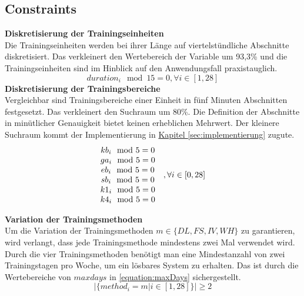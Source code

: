 \subsection{Constraints}
\textbf{Diskretisierung der Trainingseinheiten} \\[0.2em]
Die Trainingseinheiten werden bei ihrer Länge auf viertelstündliche Abschnitte diskretisiert. Das verkleinert den Wertebereich der Variable um 93,3\% und die Trainingseinheiten sind im Hinblick auf den Anwendungsfall praxistauglich.
\begin{equation}
    {duration}_i \mod 15 = 0 , \forall i \in [1, 28]
\end{equation} 
\textbf{Diskretisierung der Trainingsbereiche} \\[0.2em]
Vergleichbar sind Trainingsbereiche einer Einheit in fünf Minuten Abschnitten festgesetzt. Das verkleinert den Suchraum um 80\%. Die Definition der Abschnitte in minütlicher Genauigkeit bietet keinen erheblichen Mehrwert. Der kleinere
Suchraum kommt der Implementierung in \hyperref[sec:implementierung]{Kapitel \ref{sec:implementierung}} zugute.
\begin{equation}
\begin{array}{cc}
    kb_i \mod 5 = 0 & \multirow{6}{*}{$, \forall i \in [0, 28]$} \\
    ga_i \mod 5 = 0 & \\ 
    eb_i \mod 5 = 0 & \\ 
    sb_i \mod 5 = 0 & \\ 
    k1_i \mod 5 = 0 & \\ 
    k4_i \mod 5 = 0 & \\
\end{array}
\end{equation}

\textbf{Variation der Trainingsmethoden} \\[0.2em]
Um die Variation der Trainingsmethoden $m \in \{DL, FS, IV, WH\}$ zu garantieren, wird verlangt, dass jede Trainingsmethode mindestens zwei Mal verwendet wird. Durch die vier Trainingsmethoden benötigt man eine Mindestanzahl von zwei Trainingstagen pro Woche, um ein lösbares System zu erhalten. Das ist durch die Wertebereiche von $maxdays$ in \ref{equation:maxDays} sichergestellt.
\begin{equation} 
    |\{method_i = m | i \in [1, 28]\}| \geq 2
\end{equation} 

